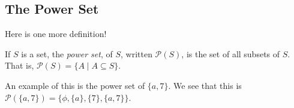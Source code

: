 \subsection{The Power Set}
Here is one more definition!
\begin{definition}
If $S$ is a set, the \emph{power set}, of $S$, written $\mathcal{P}(S)$, is the set of all subsets of $S$. That is, $\mathcal{P}(S) = \{A \mid A \subseteq S\}$. 
\end{definition}
\begin{example}
An example of this is the power set of $\{a, 7\}$. We see that this is $\mathcal{P}(\{a, 7\}) = \{\phi, \{a\}, \{7\}, \{a, 7\}\}$.
\end{example}
